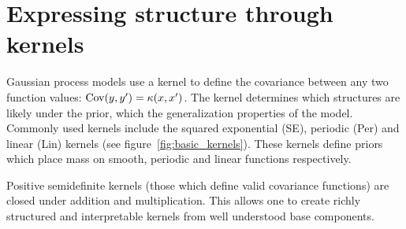 \documentclass[twoside]{article}
\begin{document}
\section{Expressing structure through kernels} 
\label{sec:Structure}

Gaussian process models use a kernel to define the covariance between any two function values: ${\textrm{Cov}(y, y') = \kappa(x,x')}$.
The kernel determines which structures are likely under the \gp{} prior, which  the generalization properties of the model.
%
%
Commonly used kernels include the squared exponential (SE), periodic (Per) and linear (Lin) kernels (see figure~\ref{fig:basic_kernels}).
These kernels define priors which place mass on smooth, periodic and linear  functions respectively.
%

Positive semidefinite kernels (\ie those which define valid covariance functions) are closed under addition and multiplication.
This allows one to create richly structured and interpretable kernels from well understood base components.
%

\end{document}
